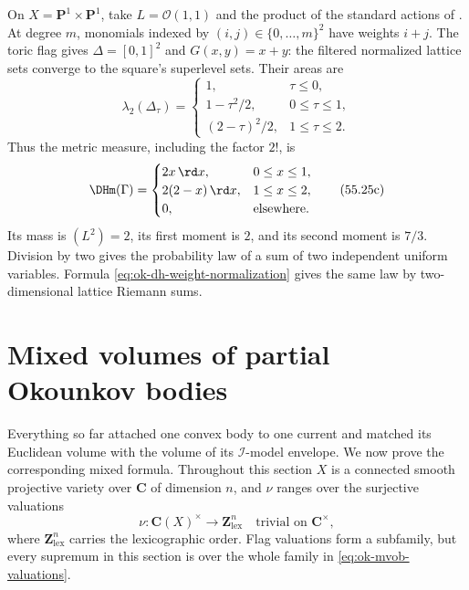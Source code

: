 \begin{example}
\label{ex:ok-dh-product-square}
On $X=\mathbf P^1\times\mathbf P^1$, take $L=\mathcal O(1,1)$ and the
product of the standard actions of .
At degree $m$, monomials indexed by $(i,j)\in\{0,\ldots,m\}^2$ have
weights $i+j$.  The toric flag gives $\Delta=[0,1]^2$ and $G(x,y)=x+y$:
the filtered normalized lattice sets converge to the square's superlevel
sets.  Their areas are
\[
 \lambda_2(\Delta_\tau)=
 \begin{cases}
 1,&\tau\leq0,\\
 1-\tau^2/2,&0\leq\tau\leq1,\\
 (2-\tau)^2/2,&1\leq\tau\leq2.
 \end{cases}
\tag{55.25b}\label{eq:ok-dh-square-profile}
\]
Thus the metric measure, including the factor $2!$, is
\[
 \DHm(\Gamma)=
 \begin{cases}
 2x\,\rd x,&0\leq x\leq1,\\
 2(2-x)\,\rd x,&1\leq x\leq2,\\
 0,&\text{elsewhere}.
 \end{cases}
\tag{55.25c}\label{eq:ok-dh-square-density}
\]
Its mass is $(L^2)=2$, its first moment is $2$, and its second moment is
$7/3$.  Division by two gives the probability law of a sum of two independent
uniform variables.  Formula \eqref{eq:ok-dh-weight-normalization} gives the
same law by two-dimensional lattice Riemann sums.
\end{example}

\section{Mixed volumes of partial Okounkov bodies}
\label{sec:ok-mixed-volumes}

Everything so far attached one convex body to one current and matched its
Euclidean volume with the volume of its $\mathcal I$-model envelope.  We
now prove the corresponding mixed formula.  Throughout this section $X$
is a connected smooth projective variety over $\mathbf C$ of dimension
$n$, and $\nu$ ranges over the surjective valuations
\[
 \nu:\mathbf C(X)^\times\longrightarrow\mathbf Z^n_{\mathrm{lex}}
 \quad\text{trivial on }\mathbf C^\times ,
\tag{55.26}\label{eq:ok-mvob-valuations}
\]
where $\mathbf Z^n_{\mathrm{lex}}$ carries the lexicographic order.  Flag
valuations form a subfamily, but every supremum in this section is over the
whole family in \eqref{eq:ok-mvob-valuations}.

